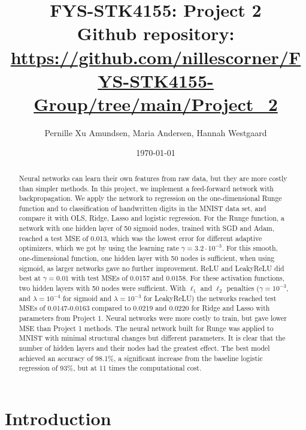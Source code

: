 \documentclass[reprint,english,notitlepage, floatfix]{revtex4-2}  %
\begin{document}
\title{FYS-STK4155: Project 2 \\ \small Github repository: \url{https://github.com/nillescorner/FYS-STK4155-Group/tree/main/Project_2}}
\date{\today}               
\author{Pernille Xu Amundsen, Maria Andersen, Hannah Westgaard}



\newpage

\begin{abstract}
    Neural networks can learn their own features from raw data, but they are more costly than simpler methods. In this project, we implement a feed-forward network with backpropagation. We apply the network to regression on the one-dimensional Runge function and to classification of handwritten digits in the MNIST data set, and compare it with OLS, Ridge, Lasso and logistic regression. For the Runge function, a network with one hidden layer of 50 sigmoid nodes, trained with SGD and Adam, reached a test MSE of 0.013, which was the lowest error for different adaptive optimizers, which we got by using the learning rate $\gamma = 3.2 \cdot 10^{-3}$. For this smooth, one-dimensional function, one hidden layer with 50 nodes is sufficient, when using sigmoid, as larger networks gave no further improvement.  ReLU and LeakyReLU did best at $\gamma = 0.01$ with test MSEs of 0.0157 and 0.0158. For these activation functions, two hidden layers with 50 nodes were sufficient. With $\ell_1$ and $\ell_2$ penalties  ($\gamma = 10^{-3}$, and $\lambda = 10^{-4}$ for sigmoid and $\lambda=10^{-3}$ for LeakyReLU) the networks reached test MSEs of 0.0147-0.0163 compared to 0.0219 and 0.0220 for Ridge and Lasso with parameters from Project 1. Neural networks were more costly to train, but gave lower MSE than Project 1 methods. The neural network built for Runge was applied to MNIST with minimal structural changes but different parameters. It is clear that the number of hidden layers and their nodes had the greatest effect. The best model achieved an accuracy of 98.1\%, a significant increase from the baseline logistic regression of 93\%, but at 11 times the computational cost. 

    
\end{abstract}


\maketitle  %

\section{Introduction} \label{sec: Introduction}
\end{document}
